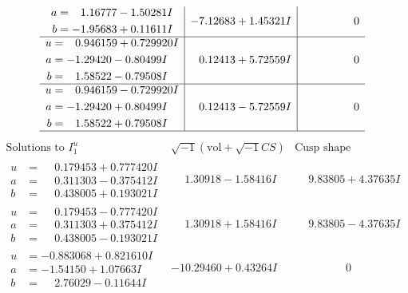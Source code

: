 \documentclass[1p]{elsarticle_modified}
\theoremstyle{definition}
\newcommand{\I}{\sqrt{-1}}
\begin{document}
$$\begin{array}{c|c|c}
\begin{aligned}
a &= \phantom{-}1.16777 - 1.50281 I \\
b &= -1.95683 + 0.11611 I\end{aligned}
 & -7.12683 + 1.45321 I & \phantom{-0.000000 } 0 \\ \hline\begin{aligned}
u &= \phantom{-}0.946159 + 0.729920 I \\
a &= -1.29420 - 0.80499 I \\
b &= \phantom{-}1.58522 - 0.79508 I\end{aligned}
 & \phantom{-}0.12413 + 5.72559 I & \phantom{-0.000000 } 0 \\ \hline\begin{aligned}
u &= \phantom{-}0.946159 - 0.729920 I \\
a &= -1.29420 + 0.80499 I \\
b &= \phantom{-}1.58522 + 0.79508 I\end{aligned}
 & \phantom{-}0.12413 - 5.72559 I & \phantom{-0.000000 } 0\\
 \hline 
 \end{array}$$\newpage$$\begin{array}{c|c|c}  
\text{Solutions to }I^u_{1}& \I (\text{vol} + \sqrt{-1}CS) & \text{Cusp shape}\\
 \hline 
\begin{aligned}
u &= \phantom{-}0.179453 + 0.777420 I \\
a &= \phantom{-}0.311303 - 0.375412 I \\
b &= \phantom{-}0.438005 + 0.193021 I\end{aligned}
 & \phantom{-}1.30918 - 1.58416 I & \phantom{-}9.83805 + 4.37635 I \\ \hline\begin{aligned}
u &= \phantom{-}0.179453 - 0.777420 I \\
a &= \phantom{-}0.311303 + 0.375412 I \\
b &= \phantom{-}0.438005 - 0.193021 I\end{aligned}
 & \phantom{-}1.30918 + 1.58416 I & \phantom{-}9.83805 - 4.37635 I \\ \hline\begin{aligned}
u &= -0.883068 + 0.821610 I \\
a &= -1.54150 + 1.07663 I \\
b &= \phantom{-}2.76029 - 0.11644 I\end{aligned}
 & -10.29460 + 0.43264 I & \phantom{-0.000000 } 0 \\ \hline\begin{aligned}

\end{aligned}
\end{array}$$
\end{document}
